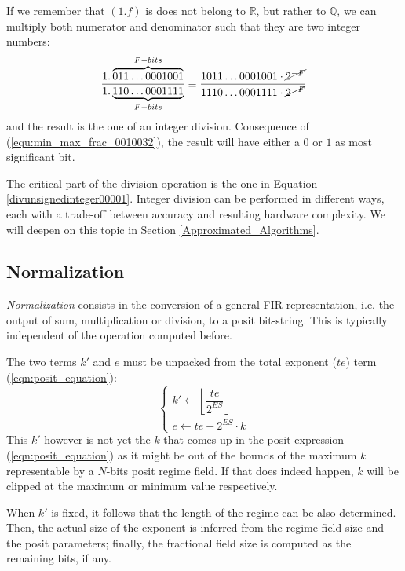 If we remember that $(1.f)$ is does not belong to $\mathbb{R}$, but rather to $ \mathbb{Q}$, we can multiply both numerator and denominator such that they are two integer numbers:
\begin{equation}\label{divunsignedinteger00001}
\frac{1.\overbrace{011\dots0001001}^{F-bits}}{1.\underbrace{110\dots0001111}_{F-bits}} \equiv \frac{1011\dots0001001 \cdot \cancel{2^{-F}}}{1110\dots0001111 \cdot \cancel{2^{-F}}}
\end{equation}
and the result is the one of an integer division. Consequence of (\ref{equ:min_max_frac_0010032}), the result will have either a $0$ or $1$ as most significant bit. 

The critical part of the division operation is the one in Equation \eqref{divunsignedinteger00001}. Integer division can be performed in different ways, each with a trade-off between accuracy and resulting hardware complexity. We will deepen on this topic in Section \ref{Approximated_Algorithms}. 




\subsection{Normalization}


\textit{Normalization} consists in the conversion of a general FIR representation, i.e. the output of sum, multiplication or division, to a posit bit-string. This is typically independent of the operation computed before.


The two terms $k'$ and $e$ must be unpacked from the total exponent ($te$) term (\eqref{eqn:posit_equation}):
\begin{equation}\label{k_and_exp_from_totalexp}
\begin{cases}
    k' \leftarrow \left \lfloor \dfrac{te}{2^{ES}} \right \rfloor \\
    e \leftarrow te - 2^{ES} \cdot k
\end{cases}
\end{equation}
This $k'$ however is not yet the $k$ that comes up in the posit expression (\eqref{eqn:posit_equation}) as it might be out of the bounds of the maximum $k$ representable by a $N$-bits posit regime field. If that does indeed happen, $k$ will be clipped at the maximum or minimum value respectively.

When $k'$ is fixed, it follows that the length of the regime can be also determined. Then, the actual size of the exponent is inferred from the regime field size and the posit parameters; finally, the fractional field size is computed as the remaining bits, if any.

